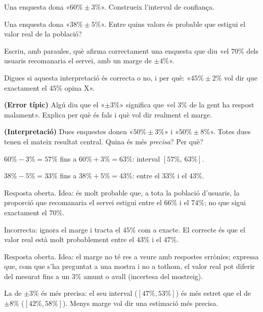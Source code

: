 \begin{exercicis}
\begin{exlist}
  \item Una enquesta dona «$60\%\pm 3\%$». Construeix l'interval de confiança.
  \item Una enquesta dona «$38\%\pm 5\%$». Entre quins valors és probable que estigui el
        valor real de la població?
  \item Escriu, amb paraules, què afirma correctament una enquesta que diu «el $70\%$ dels
        usuaris recomanaria el servei, amb un marge de $\pm 4\%$».
  \item Digues si aquesta interpretació és correcta o no, i per què: «$45\%\pm 2\%$ vol dir
        que exactament el $45\%$ opina X».
  \item \textbf{(Error típic)} Algú diu que el «$\pm 3\%$» significa que «el $3\%$ de la
        gent ha respost malament». Explica per què és fals i què vol dir realment el marge.
  \item \textbf{(Interpretació)} Dues enquestes donen «$50\%\pm 3\%$» i «$50\%\pm 8\%$».
        Totes dues tenen el mateix resultat central. Quina és més \emph{precisa}? Per què?
\end{exlist}
\end{exercicis}

\begin{solucions}
\begin{sollist}
  \item $60\%-3\%=57\%$ fins a $60\%+3\%=63\%$: interval $[57\%,\,63\%]$.
  \item $38\%-5\%=33\%$ fins a $38\%+5\%=43\%$: entre el $33\%$ i el $43\%$.
  \item Resposta oberta. Idea: és molt probable que, a tota la població d'usuaris, la
        proporció que recomanaria el servei estigui entre el $66\%$ i el $74\%$; no que
        sigui exactament el $70\%$.
  \item Incorrecta: ignora el marge i tracta el $45\%$ com a exacte. El correcte és que el
        valor real està molt probablement entre el $43\%$ i el $47\%$.
  \item Resposta oberta. Idea: el marge no té res a veure amb respostes errònies; expressa
        que, com que s'ha preguntat a una mostra i no a tothom, el valor real pot diferir
        del mesurat fins a un $3\%$ amunt o avall (incertesa del mostreig).
  \item La de $\pm 3\%$ és més precisa: el seu interval ($[47\%,53\%]$) és més estret que
        el de $\pm 8\%$ ($[42\%,58\%]$). Menys marge vol dir una estimació més precisa.
\end{sollist}
\end{solucions}
